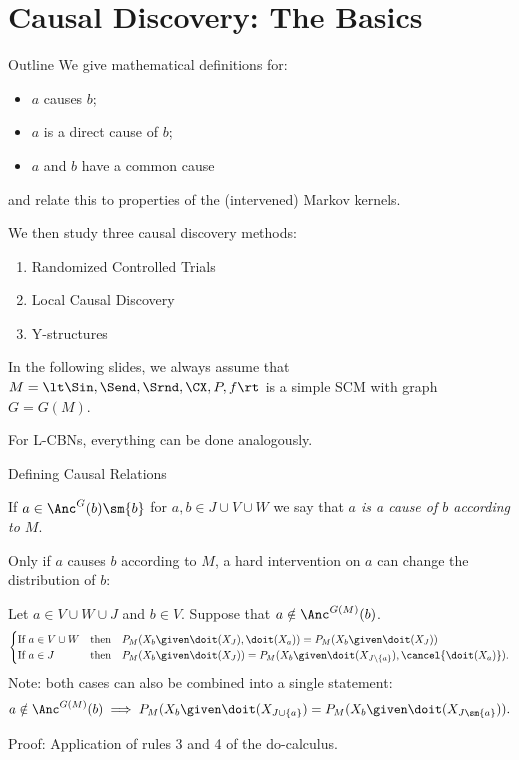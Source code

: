 \part{Causal Discovery: The Basics}
\frame{\partpage}

\begin{frame}{Outline}
  We give mathematical definitions for:
  \begin{itemize}
    \item $a$ causes $b$;
    \item $a$ is a direct cause of $b$;
    \item $a$ and $b$ have a common cause
  \end{itemize}
  and relate this to properties of the (intervened) Markov kernels.

  \medskip
  We then study three causal discovery methods:
  \begin{enumerate}
    \item Randomized Controlled Trials
    \item Local Causal Discovery
    \item Y-structures
  \end{enumerate}

  \bigskip
  In the following slides, we always assume that
  $M = \lt \Sin, \Send, \Srnd, \CX, P, f \rt$ is a simple SCM with graph $G = G(M)$.

  \bigskip
  For L-CBNs, everything can be done analogously.
\end{frame}

\begin{frame}{Defining Causal Relations}\label{frame:causes}
\begin{Def}[\ref{def:cause_of}]
  If $a \in \Anc^G(b)\sm \{b\}$ for $a, b \in J \cup V \cup W$ we say that \emph{$a$ is a cause of $b$ according to $M$}.
\end{Def}
Only if $a$ causes $b$ according to $M$, a hard intervention on $a$ can change the distribution of $b$: 
\begin{Prp}[\ref{prp:scm_causes_separation}]
  Let $a \in V \cup W \cup J$ and $b \in V$. Suppose that $a \notin \Anc^{G(M)}(b)$.
  $$\begin{cases}
    \text{If } a \in V \cup W & \text{then\quad} P_{M}(X_b \given \doit(X_J), \doit(X_a)) = P_{M}(X_b \given \doit(X_J)) \\
    \text{If } a \in J        & \text{then\quad} P_{M}(X_b \given \doit(X_J)) = P_{M}(X_b \given \doit(X_{J\setminus \{a\}}),\cancel{\doit(X_a)}).
  \end{cases}$$
  Note: both cases can also be combined into a single statement:
    $$a \notin \Anc^{G(M)}(b) \implies P_{M}(X_b \given \doit(X_{J \cup \{a\}}) = P_{M}(X_b \given \doit(X_{J\sm\{a\}})).$$
\end{Prp}
Proof: Application of rules 3 and 4 of the do-calculus.
\end{frame}


